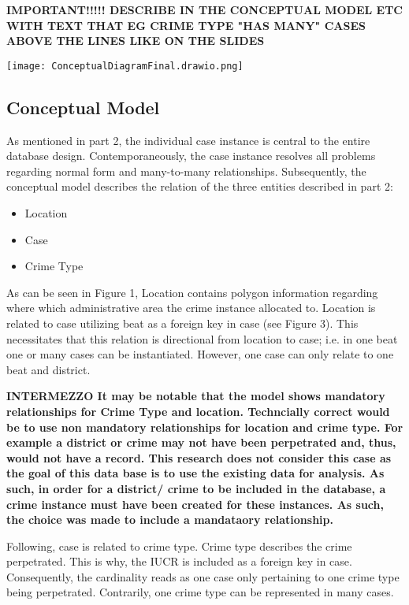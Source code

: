 \documentclass[a4paper]{article}
\begin{document}
\textbf{IMPORTANT!!!!! DESCRIBE IN THE CONCEPTUAL MODEL ETC WITH TEXT THAT EG CRIME TYPE "HAS MANY" CASES ABOVE THE LINES LIKE ON THE SLIDES}

\texttt{[image: ConceptualDiagramFinal.drawio.png]}

\subsection{Conceptual Model}
As mentioned in part 2, the individual case instance is central to the entire database design. Contemporaneously, the case instance resolves all problems regarding normal form and many-to-many relationships. Subsequently, the conceptual model describes the relation of the three entities described in part 2: 

\begin{itemize}
  \item Location
  \item Case
  \item Crime Type
\end{itemize}

\indent As can be seen in Figure 1, Location contains polygon information regarding where which administrative area the crime instance allocated to. Location is related to case utilizing beat as a foreign key in case (see Figure 3). This necessitates that this relation is directional from location to case; i.e. in one beat one or many cases can be instantiated. However, one case can only relate to one beat and district.

\textbf{INTERMEZZO It may be notable that the model shows mandatory relationships for Crime Type and location. Techncially correct would be to use non mandatory relationships for location and crime type. For example a district or crime may not have been perpetrated and, thus, would not have a record. This research does not consider this case as the goal of this data base is to use the existing data for analysis. As such, in order for a district/ crime to be included in the database, a crime instance must have been created for these instances. As such, the choice was made to include a mandataory relationship.}

Following, case is related to crime type. Crime type describes the crime perpetrated. This is why, the IUCR is included as a foreign key in case. Consequently, the cardinality reads as one case only pertaining to one crime type being perpetrated. Contrarily, one crime type can be represented in many cases.
\end{document}
